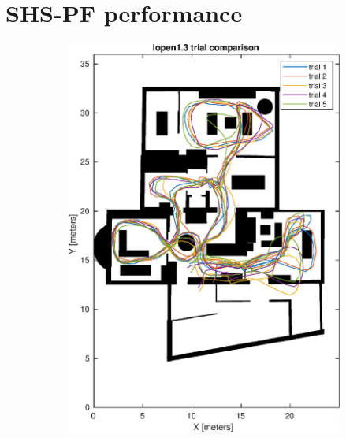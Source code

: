 \section{SHS-PF performance}
\label{app:SHS-PF trials}
\begin{figure}[H]
	\centering
	\begin{subfigure}[t]{.45\textwidth}
	\centering
	\includegraphics[width=\linewidth]{images/20201107_1142_trial_comparison_3}
	\caption{}
	\label{fig:202011071142trialcomparison3}
\end{subfigure}
\begin{subfigure}[t]{.45\textwidth}
	\centering

\end{subfigure}
\end{figure}
